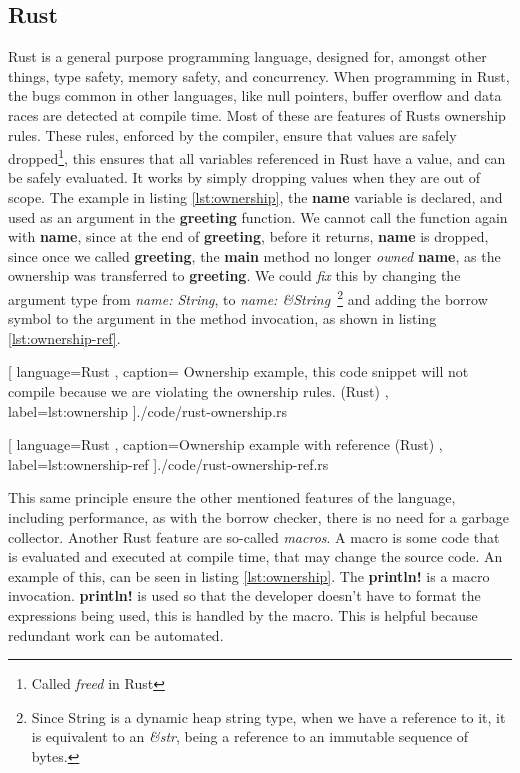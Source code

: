 \subsection{Rust}

Rust is a general purpose programming language, designed for, amongst other
things, type safety, memory safety, and concurrency. When programming in Rust,
the bugs common in other languages, like null pointers, buffer overflow and data
races are detected at compile time. Most of these are features of Rusts
ownership rules. These rules, enforced by the compiler, ensure that values are
safely dropped\footnote{Called \textit{freed} in Rust}, this ensures that all
variables referenced in Rust have a value, and can be safely evaluated. It works
by simply dropping values when they are out of scope. The example in listing
\ref{lst:ownership}, the \textbf{name} variable is declared, and used as an
argument in the \textbf{greeting} function. We cannot call the function again
with \textbf{name}, since at the end of \textbf{greeting}, before it returns,
\textbf{name} is dropped, since once we called \textbf{greeting}, the
\textbf{main} method no longer \textit{owned} \textbf{name}, as the ownership
was transferred to \textbf{greeting}. We could \textit{fix} this by changing the
argument type from \textit{name: String}, to \textit{name: \&String}~\footnote{Since String is a dynamic heap string type, when we have a reference to it, it is equivalent to an \textit{\&str}, being a reference to an immutable sequence of bytes.}
and adding the borrow symbol to the argument in
the method invocation, as shown in listing \ref{lst:ownership-ref}.

\begin{center}
  
    [ language=Rust
    , caption={
      Ownership example, this code snippet will not compile because we are
      violating the ownership rules. (Rust)
    }
    , label=lst:ownership
    ]{./code/rust-ownership.rs}
\end{center}

\begin{center}
  
    [ language=Rust
    , caption={Ownership example with reference (Rust)}
    , label=lst:ownership-ref
    ]{./code/rust-ownership-ref.rs}
\end{center}

This same principle ensure the other mentioned features of the language,
including performance, as with the borrow checker, there is no need for a
garbage collector. Another Rust feature are so-called \textit{macros}. A macro
is some code that is evaluated and executed at compile time, that may change
the source code. An example of this, can be seen in listing \ref{lst:ownership}.
The \textbf{println!} is a macro invocation. \textbf{println!} is used so that
the developer doesn't have to format the expressions being used, this is handled
by the macro. This is helpful because redundant work can be automated.


